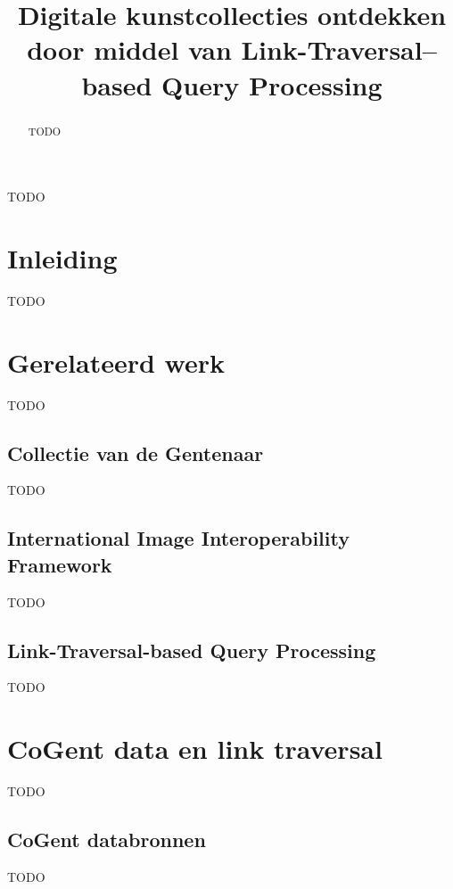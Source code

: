 \documentclass[conference]{IEEEtran}
\begin{document}
\title{Digitale kunstcollecties ontdekken door middel van Link-Traversal–based Query Processing}

\author{
}

\maketitle

\begin{abstract}
TODO
\end{abstract}

\begin{IEEEkeywords}
TODO
\end{IEEEkeywords}

\section*{Inleiding}
TODO

\section{Gerelateerd werk}
TODO

\subsection{Collectie van de Gentenaar}
TODO

\subsection{International Image Interoperability Framework}
TODO

\subsection{Link-Traversal-based Query Processing}
TODO

\section{CoGent data en link traversal}
TODO

\subsection{CoGent databronnen}
TODO
\end{document}
